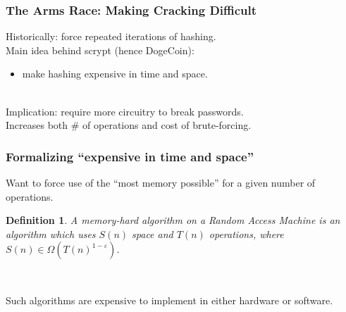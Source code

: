 \documentclass[aspectratio=43]{beamer}
\newtheorem{defn}{Definition}
\newenvironment{changemargin}[1]{%
  \begin{list}{}{%
    \setlength{\topsep}{0pt}%
    \setlength{\leftmargin}{#1}%
    \setlength{\rightmargin}{1em}
    \setlength{\listparindent}{\parindent}%
    \setlength{\itemindent}{\parindent}%
    \setlength{\parsep}{\parskip}%
  }%
  \item[]}{\end{list}}
\begin{document}
\begin{frame}
  \frametitle{The Arms Race: Making Cracking Difficult}
  \begin{changemargin}{2cm}
    Historically: force repeated iterations of hashing.\\[1em]

    Main idea behind scrypt (hence DogeCoin):
    \begin{itemize}
    \item make hashing expensive in time and space.
    \end{itemize}~\\
    Implication: require more circuitry to break passwords.\\
    Increases both \# of operations and cost of brute-forcing.
  \end{changemargin}
\end{frame}

\begin{frame}
  \frametitle{Formalizing ``expensive in time and space''}
  \begin{changemargin}{2cm}
    Want to force use of the ``most memory possible'' for a given
    number of operations.\\[1em]
  \end{changemargin}
    \begin{defn}
      A \emph{memory-hard} algorithm on a Random Access Machine is an
      algorithm which uses $S(n)$ space and $T(n)$ operations, where
      $S(n) \in \Omega(T(n)^{1-\varepsilon})$.
    \end{defn}~\\
    \begin{changemargin}{2cm}
      Such algorithms are expensive to implement in either hardware or software.
    \end{changemargin}

\end{frame}
\end{document}
